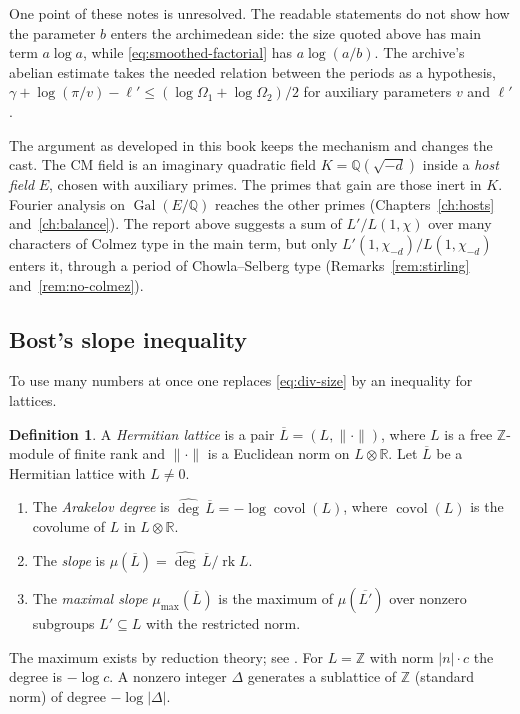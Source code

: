 \documentclass[11pt]{amsbook}
\theoremstyle{plain}
\theoremstyle{definition}
\newtheorem{definition}[theorem]{Definition}
\theoremstyle{remark}
\numberwithin{equation}{section}
\numberwithin{figure}{chapter}
\numberwithin{table}{chapter}
\newcommand{\Q}{\mathbb{Q}}
\newcommand{\Z}{\mathbb{Z}}
\newcommand{\R}{\mathbb{R}}
\newcommand{\Gal}{\operatorname{Gal}}
\newcommand{\rk}{\operatorname{rk}}
\newcommand{\degh}{\widehat{\deg}}
\newcommand{\covol}{\operatorname{covol}}
\begin{document}
One point of these notes is unresolved. The readable statements do
not show how the parameter $b$ enters the archimedean side: the size
quoted above has main term $a\log a$, while
\eqref{eq:smoothed-factorial} has $a\log(a/b)$. The archive's
abelian estimate takes the needed relation between the periods as a
hypothesis,
$\gamma + \log(\pi/v) - \ell' \le (\log\Omega_1 + \log\Omega_2)/2$
for auxiliary parameters $v$ and $\ell'$
\cite[\nolinkurl{Formalism/ProductFormula/StatementOCCM.lean}]
{AlpogeArchive2026}.

The argument as developed in this book keeps the mechanism and
changes the cast. The CM field is an imaginary quadratic field
$K = \Q(\sqrt{-d})$ inside a \emph{host field} $E$, chosen with
auxiliary primes. The primes that gain are those inert in $K$.
Fourier analysis on $\Gal(E/\Q)$ reaches the other primes
(Chapters~\ref{ch:hosts} and~\ref{ch:balance}). The report above
suggests a sum of $L'/L(1,\chi)$ over many characters of Colmez
type in the main term, but only
$L'(1,\chi_{-d})/L(1,\chi_{-d})$ enters it, through a period of
Chowla--Selberg type (Remarks~\ref{rem:stirling}
and~\ref{rem:no-colmez}).

\subsection{Bost's slope inequality}

To use many numbers at once one replaces \eqref{eq:div-size} by an
inequality for lattices.

\begin{definition}\label{def:slope}
A \emph{Hermitian lattice} is a pair $\overline L = (L, \|\cdot\|)$,
where $L$ is a free $\Z$-module of finite rank and $\|\cdot\|$ is a
Euclidean norm on $L \otimes \R$. Let $\overline L$ be a Hermitian
lattice with $L \ne 0$.
\begin{enumerate}[label=(\roman*)]
\item The \emph{Arakelov degree} is
$\degh\,\overline L = -\log\covol(L)$, where $\covol(L)$ is the
covolume of $L$ in $L\otimes\R$.
\item The \emph{slope} is
$\mu(\overline L) = \degh\,\overline L/\rk L$.
\item The \emph{maximal slope} $\mu_{\max}(\overline L)$ is the
maximum of $\mu(\overline{L'})$ over nonzero subgroups
$L' \subseteq L$ with the restricted norm.
\end{enumerate}
\end{definition}

The maximum exists by reduction theory; see \cite{Bost1996}. For
$L = \Z$ with norm $|n|\cdot c$ the degree is $-\log c$. A nonzero
integer $\Delta$ generates a sublattice of $\Z$ (standard norm) of
degree $-\log|\Delta|$.
\end{document}
